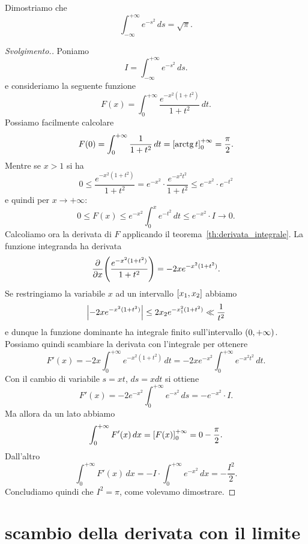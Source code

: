 \begin{exercise}
  \label{ex:integrale_gaussiana}%
Dimostriamo che 
\[
  \int_{-\infty}^{+\infty} e^{-s^2}\, ds = \sqrt \pi.
\]
\end{exercise}
%
\begin{proof}[Svolgimento.]
Poniamo
\[
  I = \int_{-\infty}^{+\infty} e^{-s^2}\, ds.
\]
e consideriamo la seguente funzione
\[ 
  F(x) = \int_0^{+\infty} \frac{e^{-x^2(1+t^2)}}{1+t^2}\, dt.
\]
Possiamo facilmente calcolare 
\[
  F(0) = \int_0^{+\infty} \frac{1}{1+t^2}\, dt = {\left[ \operatorname{arctg} t \right]}_0^{+\infty} = \frac \pi 2.
\]
Mentre se $x>1$ si ha 
\[
  0\le \frac{e^{-x^2(1+t^2)}}{1+t^2}
  = e^{-x^2}\cdot \frac{e^{-x^2t^2}}{1+t^2}
  \le e^{-x^2}\cdot e^{-t^2}
\]
e quindi per $x\to +\infty$:
\[
  0\le F(x) \le e^{-x^2} \int_0^x e^{-t^2}\, dt \le e^{-x^2}\cdot I \to 0.
\]
Calcoliamo ora la derivata di $F$ applicando il teorema~\ref{th:derivata_integrale}.
La funzione integranda ha derivata 
\[
 \frac{\partial}{\partial x}{\left( \frac{e^{-x^2(1+t^2)}}{1+t^2} \right)}
 = -2x e^{-x^2(1+t^2)}.
\]
Se restringiamo la variabile $x$ ad un intervallo $\left[x_1,x_2\right]$
abbiamo 
\[
 {\left|-2x e^{-x^2(1+t^2)}\right|}
 \le 2 x_2 e^{-x_1^2(1+t^2)} \ll \frac{1}{t^2}
\]
e dunque la funzione dominante ha integrale finito sull'intervallo 
$\left(0,+\infty\right)$. 
Possiamo quindi scambiare la derivata con l'integrale per ottenere 
\[
 F'(x) = - 2 x\int_0^{+\infty} e^{-x^2(1+t^2)}\, dt
       = - 2 x e^{-x^2}\int_0^{+\infty} e^{-x^2t^2}\, dt. 
\]
Con il cambio di variabile $s=xt$, $ds=x dt$ si ottiene
\[
 F'(x) = -2 e^{-x^2}\int_0^{+\infty} e^{-s^2}\, ds = - e^{-x^2}\cdot I.
\]
Ma allora da un lato abbiamo 
\[
  \int_0^{+\infty} F'(x)\, dx 
  = {\left[ F(x) \right]}_0^{+\infty}  = 0 - \frac{\pi}{2}.
\]
Dall'altro 
\[
 \int_0^{+\infty} F'(x)\, dx 
 = - I \cdot \int_0^{+\infty} e^{-x^2}\, dx
 = - \frac{I^2}{2}. 
\]
Concludiamo quindi che $I^2=\pi$, come volevamo dimostrare.
\end{proof}

\section{scambio della derivata con il limite}

